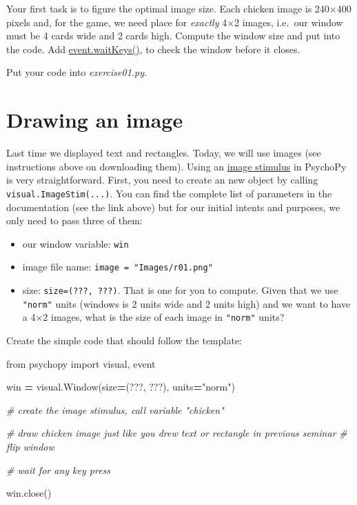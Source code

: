 \documentclass[
]{book}
\newenvironment{Shaded}{\begin{snugshade}}{\end{snugshade}}
\newcommand{\CommentTok}[1]{\textcolor[rgb]{0.56,0.35,0.01}{\textit{#1}}}
\newcommand{\ImportTok}[1]{#1}
\newcommand{\NormalTok}[1]{#1}
\newcommand{\OperatorTok}[1]{\textcolor[rgb]{0.81,0.36,0.00}{\textbf{#1}}}
\newcommand{\StringTok}[1]{\textcolor[rgb]{0.31,0.60,0.02}{#1}}
\providecommand{\tightlist}{%
  \setlength{\itemsep}{0pt}\setlength{\parskip}{0pt}}
\begin{document}
Your first task is to figure the optimal image size. Each chicken image is 240×400 pixels and, for the game, we need place for \emph{exactly} 4×2 images, i.e.~our window must be 4 cards wide and 2 cards high. Compute the window size and put into the code. Add \href{https://psychopy.org/api/event.html\#psychopy.event.waitKeys}{event.waitKeys()}, to check the window before it closes.

Put your code into \emph{exercise01.py}.

\hypertarget{drawing-an-image}{%
\section{Drawing an image}\label{drawing-an-image}}

Last time we displayed text and rectangles. Today, we will use images (see instructions above on downloading them). Using an \href{https://psychopy.org/api/visual/imagestim.html}{image stimulus} in PsychoPy is very straightforward. First, you need to create an new object by calling \texttt{visual.ImageStim(...)}. You can find the complete list of parameters in the documentation (see the link above) but for our initial intents and purposes, we only need to pass three of them:

\begin{itemize}
\tightlist
\item
  our window variable: \texttt{win}
\item
  image file name: \texttt{image\ =\ "Images/r01.png"}
\item
  size: \texttt{size=(???,\ ???)}. That is one for you to compute. Given that we use \texttt{"norm"} units (windows is 2 units wide and 2 units high) and we want to have a 4×2 images, what is the size of each image in \texttt{"norm"} units?
\end{itemize}

Create the simple code that should follow the template:

\begin{Shaded}
\begin{Highlighting}[]
\ImportTok{from}\NormalTok{ psychopy }\ImportTok{import}\NormalTok{ visual, event}
 
\NormalTok{win }\OperatorTok{=}\NormalTok{ visual.Window(size}\OperatorTok{=}\NormalTok{(???, ???), units}\OperatorTok{=}\StringTok{"norm"}\NormalTok{)}

\CommentTok{\# create the image stimulus, call variable "chicken"}

\CommentTok{\# draw chicken image just like you drew text or rectangle in previous seminar}
\CommentTok{\# flip window}

\CommentTok{\# wait for any key press}

\NormalTok{win.close()}
\end{Highlighting}
\end{Shaded}
\end{document}
